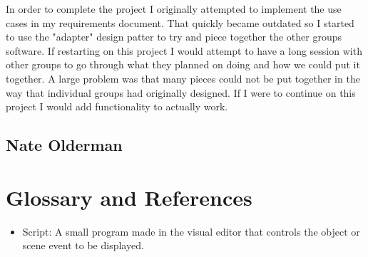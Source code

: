 \documentclass[12pt]{article}
\begin{document}
In order to complete the project I originally attempted to implement the use cases in my requirements document.  That quickly became outdated so I started to use the "adapter" design patter to try and piece together the other groups software.  If restarting on this project I would attempt to have a long session with other groups to go through what they planned on doing and how we could put it together.  A large problem was that many pieces could not be put together in the way that individual groups  had originally designed.  If I were to continue on this project I would add functionality to actually work.

\subsection{Nate Olderman}


\section{Glossary and References}

\begin{itemize}
\item Script:  A small program made in the visual editor that controls the object or scene event to be displayed.
\end{itemize}
\end{document}
